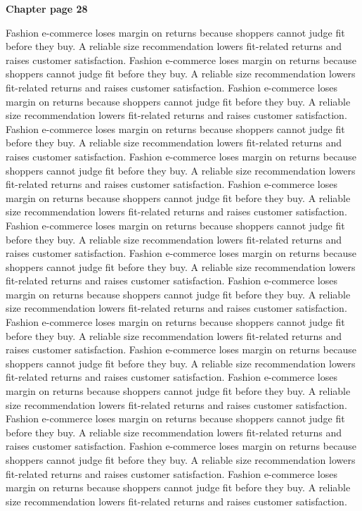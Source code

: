 \documentclass[a4paper,11pt]{article}
\begin{document}
{\headfont\bfseries\Large Chapter page 28}\par\medskip
Fashion e-commerce loses margin on returns because shoppers cannot judge fit before they buy. A reliable size recommendation lowers fit-related returns and raises customer satisfaction. Fashion e-commerce loses margin on returns because shoppers cannot judge fit before they buy. A reliable size recommendation lowers fit-related returns and raises customer satisfaction. Fashion e-commerce loses margin on returns because shoppers cannot judge fit before they buy. A reliable size recommendation lowers fit-related returns and raises customer satisfaction. Fashion e-commerce loses margin on returns because shoppers cannot judge fit before they buy. A reliable size recommendation lowers fit-related returns and raises customer satisfaction. Fashion e-commerce loses margin on returns because shoppers cannot judge fit before they buy. A reliable size recommendation lowers fit-related returns and raises customer satisfaction. 
Fashion e-commerce loses margin on returns because shoppers cannot judge fit before they buy. A reliable size recommendation lowers fit-related returns and raises customer satisfaction. Fashion e-commerce loses margin on returns because shoppers cannot judge fit before they buy. A reliable size recommendation lowers fit-related returns and raises customer satisfaction. Fashion e-commerce loses margin on returns because shoppers cannot judge fit before they buy. A reliable size recommendation lowers fit-related returns and raises customer satisfaction. Fashion e-commerce loses margin on returns because shoppers cannot judge fit before they buy. A reliable size recommendation lowers fit-related returns and raises customer satisfaction. Fashion e-commerce loses margin on returns because shoppers cannot judge fit before they buy. A reliable size recommendation lowers fit-related returns and raises customer satisfaction. 
Fashion e-commerce loses margin on returns because shoppers cannot judge fit before they buy. A reliable size recommendation lowers fit-related returns and raises customer satisfaction. Fashion e-commerce loses margin on returns because shoppers cannot judge fit before they buy. A reliable size recommendation lowers fit-related returns and raises customer satisfaction. Fashion e-commerce loses margin on returns because shoppers cannot judge fit before they buy. A reliable size recommendation lowers fit-related returns and raises customer satisfaction. Fashion e-commerce loses margin on returns because shoppers cannot judge fit before they buy. A reliable size recommendation lowers fit-related returns and raises customer satisfaction. Fashion e-commerce loses margin on returns because shoppers cannot judge fit before they buy. A reliable size recommendation lowers fit-related returns and raises customer satisfaction. \newpage
\end{document}
